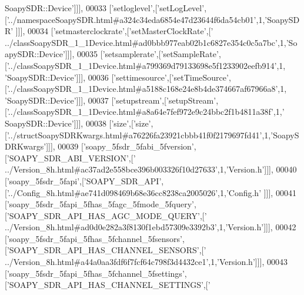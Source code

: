 \begin{DoxyCode}
{      SoapySDR::Device'}]]],
00033   [\textcolor{stringliteral}{'setloglevel'},[\textcolor{stringliteral}{'setLogLevel'},[\textcolor{stringliteral}{'../namespaceSoapySDR.html#a324c34eda6854e47d23644f6da54cb01'},1,\textcolor{stringliteral}{'SoapySDR'}
      ]]],
00034   [\textcolor{stringliteral}{'setmasterclockrate'},[\textcolor{stringliteral}{'setMasterClockRate'},[\textcolor{stringliteral}{'
      ../classSoapySDR\_1\_1Device.html#ad0bbb977eab02b1c6827e354c0c5a7bc'},1,\textcolor{stringliteral}{'SoapySDR::Device'}]]],
00035   [\textcolor{stringliteral}{'setsamplerate'},[\textcolor{stringliteral}{'setSampleRate'},[\textcolor{stringliteral}{'../classSoapySDR\_1\_1Device.html#a799369d79133698e5f1233902eefb914'},1,\textcolor{stringliteral}{
      'SoapySDR::Device'}]]],
00036   [\textcolor{stringliteral}{'settimesource'},[\textcolor{stringliteral}{'setTimeSource'},[\textcolor{stringliteral}{'../classSoapySDR\_1\_1Device.html#a5188c168e24e8b4de374667af67966a8'},1,\textcolor{stringliteral}{
      'SoapySDR::Device'}]]],
00037   [\textcolor{stringliteral}{'setupstream'},[\textcolor{stringliteral}{'setupStream'},[\textcolor{stringliteral}{'../classSoapySDR\_1\_1Device.html#a8a64e7fef972e9c24bbc2f1b4811a38f'},1,\textcolor{stringliteral}{'
      SoapySDR::Device'}]]],
00038   [\textcolor{stringliteral}{'size'},[\textcolor{stringliteral}{'size'},[\textcolor{stringliteral}{'../structSoapySDRKwargs.html#a76226fa23921cbbb41f0f2179697fd41'},1,\textcolor{stringliteral}{'SoapySDRKwargs'}]]],
00039   [\textcolor{stringliteral}{'soapy\_5fsdr\_5fabi\_5fversion'},[\textcolor{stringliteral}{'SOAPY\_SDR\_ABI\_VERSION'},[\textcolor{stringliteral}{'
      ../Version\_8h.html#ac37ad2e558bce396b003326f10d27633'},1,\textcolor{stringliteral}{'Version.h'}]]],
00040   [\textcolor{stringliteral}{'soapy\_5fsdr\_5fapi'},[\textcolor{stringliteral}{'SOAPY\_SDR\_API'},[\textcolor{stringliteral}{'../Config\_8h.html#ae741d098469b68e36cc8238ca2005026'},1,\textcolor{stringliteral}{'Config.h'}
      ]]],
00041   [\textcolor{stringliteral}{'soapy\_5fsdr\_5fapi\_5fhas\_5fagc\_5fmode\_5fquery'},[\textcolor{stringliteral}{'SOAPY\_SDR\_API\_HAS\_AGC\_MODE\_QUERY'},[\textcolor{stringliteral}{'
      ../Version\_8h.html#ad0d0e282a3f8130f1ebd57309e3392b3'},1,\textcolor{stringliteral}{'Version.h'}]]],
00042   [\textcolor{stringliteral}{'soapy\_5fsdr\_5fapi\_5fhas\_5fchannel\_5fsensors'},[\textcolor{stringliteral}{'SOAPY\_SDR\_API\_HAS\_CHANNEL\_SENSORS'},[\textcolor{stringliteral}{'
      ../Version\_8h.html#a44a0aa3fdf6f7fcf64c798f3d4432ce1'},1,\textcolor{stringliteral}{'Version.h'}]]],
00043   [\textcolor{stringliteral}{'soapy\_5fsdr\_5fapi\_5fhas\_5fchannel\_5fsettings'},[\textcolor{stringliteral}{'SOAPY\_SDR\_API\_HAS\_CHANNEL\_SETTINGS'},[\textcolor{stringliteral}{'
}
\end{DoxyCode}
